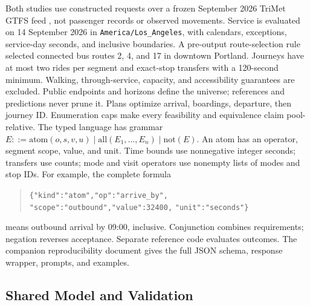 \documentclass[a4paper,twoside]{article}
\begin{document}
\noindent Both studies use constructed requests over a frozen September 2026 TriMet GTFS feed \cite{trimet,gtfs}, not passenger records or observed movements. Service is evaluated on 14 September 2026 in \texttt{America/Los\_Angeles}, with calendars, exceptions, service-day seconds, and inclusive boundaries.
A pre-output route-selection rule selected connected bus routes 2, 4, and 17 in downtown Portland. Journeys have at most two rides per segment and exact-stop transfers with a 120-second minimum. Walking, through-service, capacity, and accessibility guarantees are excluded. Public endpoints and horizons define the universe; references and predictions never prune it. Plans optimize arrival, boardings, departure, then journey ID. Enumeration caps make every feasibility and equivalence claim pool-relative.
The typed language has grammar $E::=\mathrm{atom}(o,s,v,u)\mid\mathrm{all}(E_1,\ldots,E_n)\mid\mathrm{not}(E)$. An atom has an operator, segment scope, value, and unit. Time bounds use nonnegative integer seconds; transfers use counts; mode and visit operators use nonempty lists of modes and stop IDs. For example, the complete formula
\begin{quote}\small
\texttt{\{"kind":"atom","op":"arrive\_by",}\newline
\texttt{"scope":"outbound","value":32400,}\newline
\texttt{"unit":"seconds"\}}
\end{quote}
means outbound arrival by 09:00, inclusive. Conjunction combines requirements; negation reverses acceptance. Separate reference code evaluates outcomes. The companion reproducibility document gives the full JSON schema, response wrapper, prompts, and examples.


\subsection{Shared Model and Validation}
\end{document}

